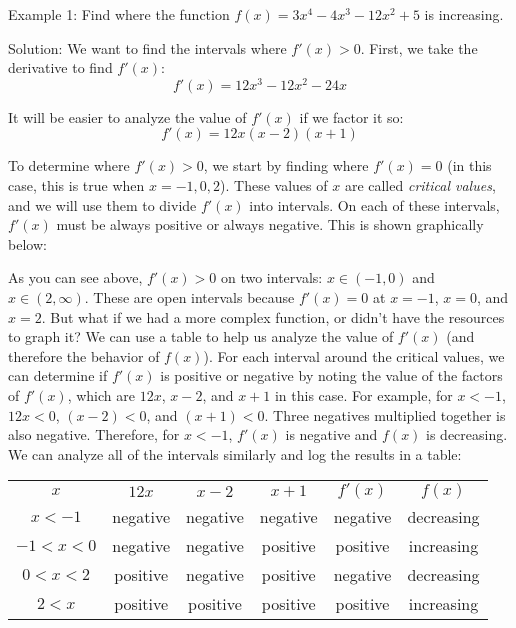 Example 1: Find where the function $f(x) = 3x^4-4x^3-12x^2+5$ is increasing. 

Solution: We want to find the intervals where $f'(x)>0$. First, we take the derivative to find $f'(x)$:
$$f'(x) = 12x^3-12x^2-24x$$

It will be easier to analyze the value of $f'(x)$ if we factor it so:
$$f'(x) = 12x(x-2)(x+1)$$

To determine where $f'(x)>0$, we start by finding where $f'(x)=0$ (in this case, this is true when $x=-1, 0, 2$). These values of $x$ are called \textit{critical values}, and we will use them to divide $f'(x)$ into intervals. On each of these intervals, $f'(x)$ must be always positive or always negative. This is shown graphically below:


As you can see above, $f'(x)>0$ on two intervals: $x \in (-1, 0) $ and $x \in (2, \infty)$. These are open intervals because $f'(x)=0$ at $x=-1$, $x=0$, and $x=2$. But what if we had a more complex function, or didn't have the resources to graph it? We can use a table to help us analyze the value of $f'(x)$ (and therefore the behavior of $f(x)$). For each interval around the critical values, we can determine if $f'(x)$ is positive or negative by noting the value of the factors of $f'(x)$, which are $12x$, $x-2$, and $x+1$ in this case. For example, for $x<-1$, $12x<0$, $(x-2)<0$, and $(x+1)<0$. Three negatives multiplied together is also negative. Therefore, for $x<-1$, $f'(x)$ is negative and $f(x)$ is decreasing. We can analyze all of the intervals similarly and log the results in a table:

\begin{tabular}{c | c | c |c|c|c}
\hline
$x$ & $12x$ & $x-2$ & $x+1$ & $f'(x)$ & $f(x)$ \\
$x<-1$ & negative & negative & negative & negative &decreasing\\
$-1<x<0$ & negative & negative & positive & positive & increasing \\
$0<x<2$ & positive & negative & positive & negative & decreasing \\
$2<x$ & positive & positive & positive & positive & increasing\\
\end{tabular}

